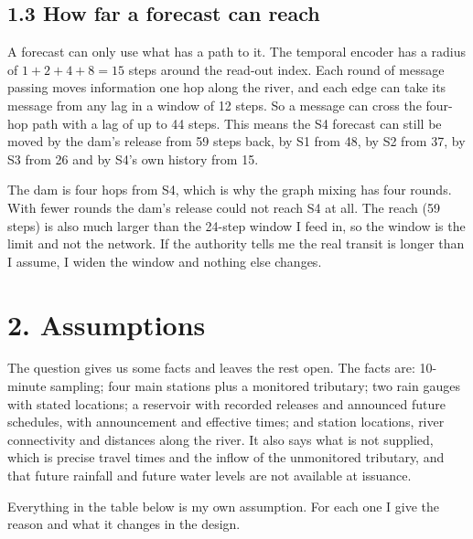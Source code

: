 \documentclass[11pt,letterpaper]{article}
\begin{document}
\subsection*{1.3 How far a forecast can reach}

A forecast can only use what has a path to it. The temporal encoder has a radius of $1+2+4+8=15$ steps around the read-out
index. Each round of message passing moves information one hop along the river,
and each edge can take its message from any lag in a window of 12 steps. So a
message can cross the four-hop path with a lag of up to 44 steps. This means the
S4 forecast can still be moved by the dam's release from 59 steps back, by S1
from 48, by S2 from 37, by S3 from 26 and by S4's own history from 15.

The dam is four hops from S4, which is why the graph mixing has four rounds. With
fewer rounds the dam's release could not reach S4 at all. The reach (59 steps) is
also much larger than the 24-step window I feed in, so the window is the limit
and not the network. If the authority tells me the real transit is longer than I
assume, I widen the window and nothing else changes.


\section*{2. Assumptions}

The question gives us some facts and leaves the rest open. The facts are:
10-minute sampling; four main stations plus a monitored tributary; two rain gauges
with stated locations; a reservoir with recorded releases and announced future
schedules, with announcement and effective times; and station locations, river
connectivity and distances along the river. It also says what is not supplied,
which is precise travel times and the inflow of the unmonitored tributary, and that
future rainfall and future water levels are not available at issuance.

Everything in the table below is my own assumption. For each one I give the reason
and what it changes in the design.
\end{document}
